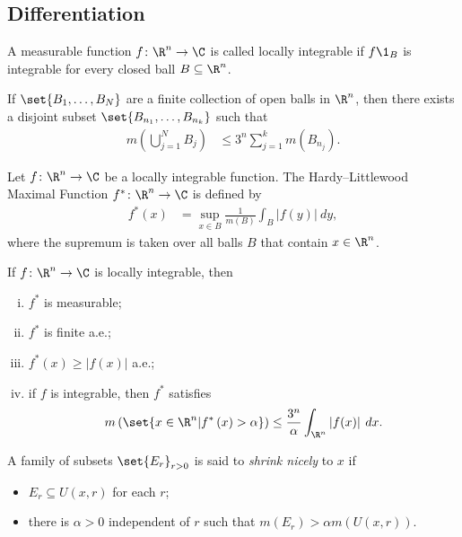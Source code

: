 \documentclass[10pt]{mypackage}
\begin{document}
\subsection{Differentiation}%
\begin{definition}
  A measurable function $f\colon \R^n\rightarrow \C$ is called locally integrable if $f\1_{B}$ is integrable for every closed ball $B\subseteq \R^n$.
\end{definition}
\begin{theorem}
  If $\set{B_1,\dots,B_N}$ are a finite collection of open balls in $\R^n$, then there exists a disjoint subset $\set{B_{n_1},\dots,B_{n_k}}$ such that
  \begin{align*}
    m\left( \bigcup_{j=1}^{N} B_j \right) &\leq 3^{n} \sum_{j=1}^{k} m\left( B_{n_j} \right).
  \end{align*}
\end{theorem}
\begin{definition}
Let $f\colon \R^n\rightarrow \C$ be a locally integrable function. The Hardy--Littlewood Maximal Function $f^{\ast}\colon \R^n\rightarrow \C$ is defined by
\begin{align*}
  f^{\ast}\left( x \right) &= \sup_{x\in B} \frac{1}{m(B)} \int_{B}^{} \left\vert f(y) \right\vert\:dy,
\end{align*}
where the supremum is taken over all balls $B$ that contain $x\in \R^n$.
\end{definition}
\begin{theorem}
  If $f\colon \R^n\rightarrow \C$ is locally integrable, then
  \begin{enumerate}[(i)]
    \item $f^{\ast}$ is measurable;
    \item $f^{\ast}$ is finite a.e.;
    \item $f^{\ast}\left( x \right) \geq \left\vert f(x) \right\vert$ a.e.;
    \item if $f$ is integrable, then $f^{\ast}$ satisfies
      \begin{align*}
        m\left( \set{x\in \R^n | f^{\ast}\left( x \right) > \alpha} \right) \leq \frac{3^{n}}{\alpha} \int_{\R^n}^{} \left\vert f(x) \right\vert\:dx.
      \end{align*}
  \end{enumerate}
\end{theorem}
\begin{definition}
  A family of subsets $\set{E_r}_{r > 0}$ is said to \textit{shrink nicely} to $x$ if
  \begin{itemize}
    \item $E_r\subseteq U\left( x,r \right)$ for each $r$;
    \item there is $\alpha > 0$ independent of $r$ such that $m\left( E_r \right) > \alpha m\left( U\left( x,r \right) \right)$.
  \end{itemize}
\end{definition}
\end{document}
